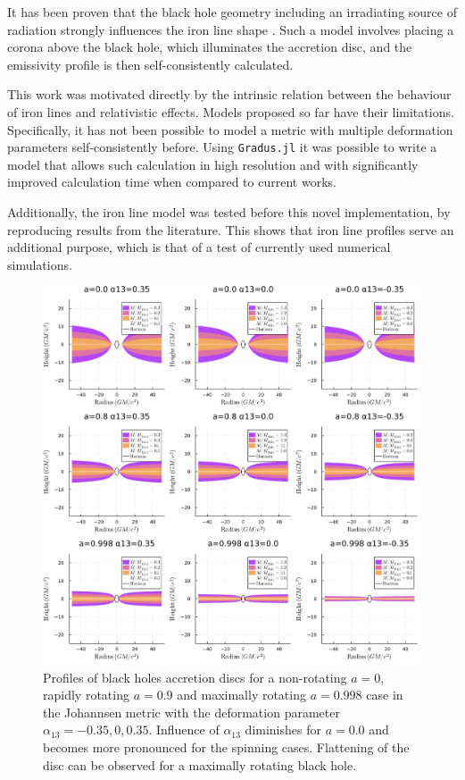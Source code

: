 \documentclass[fleqn,usenatbib,useAMS]{mnras}
\begin{document}
It has been proven that the black hole geometry including an irradiating source of radiation strongly influences the iron line shape \cite{dauser2016relativistic}. Such a model involves placing a corona above the black hole, which illuminates the accretion disc, and the emissivity profile is then self-consistently calculated. 

This work was motivated directly by the intrinsic relation between the behaviour of iron lines and relativistic effects. Models proposed so far have their limitations. Specifically, it has not been possible to model a metric with multiple deformation parameters self-consistently before. Using {\tt Gradus.jl} it was possible to write a model that allows such calculation in high resolution and with significantly improved calculation time when compared to current works.

Additionally, the iron line model was tested before this novel implementation, by reproducing results from the literature. This shows that iron line profiles serve an additional purpose, which is that of a test of currently used numerical simulations. 

\newpage

\begin{figure}[h!]
    \centering
    \includegraphics[width=0.98\linewidth]{figures/abdikamalov20.png}
    \caption{Profiles of black holes accretion discs for a non-rotating $a = 0$, rapidly rotating $a = 0.9$ and maximally rotating $a = 0.998$ case in the Johannsen metric with the deformation parameter $\alpha_{13} = -0.35, 0, 0.35$. Influence of $\alpha_{13}$ diminishes for $a = 0.0$ and becomes more pronounced for the spinning cases. Flattening of the disc can be observed for a maximally rotating black hole.}
    \label{eddingtonratio}
\end{figure}
\end{document}
